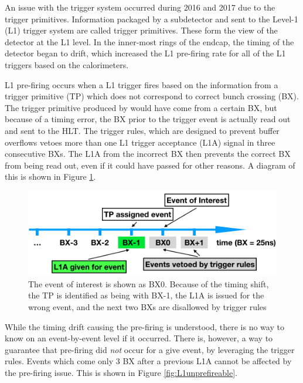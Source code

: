An issue with the \ECAL trigger system occurred during 2016 and 2017 due to the \ECAL trigger primitives. Information packaged by a subdetector and sent to the Level-1 (L1) trigger system are called trigger primitives.  These form the view of the \CMS detector at the L1 level.  In the inner-most rings of the \ECAL endcap, the timing of the detector began to drift, which increased the L1 pre-firing rate for all of the L1 triggers based on the calorimeters.

L1 pre-firing occurs when a L1 trigger fires based on the information from a trigger primitive (TP) which does not correspond to correct bunch crossing (BX).  The trigger primitive produced by \ECAL would have come from a certain BX, but because of a timing error, the BX prior to the trigger event is actually read out and sent to the HLT.  The \CMS trigger rules, which are designed to prevent buffer overflows vetoes more than one L1 trigger acceptance (L1A) signal in three consecutive BXs. The L1A from the incorrect BX then prevents the correct BX from being read out, even if it could have passed for other reasons.
A diagram of this is shown in Figure \ref{fig:L1prefire}.
\begin{figure}[!tp]
  \centering
  \includegraphics[width=\textwidth]{figures/prefire.png}
  \caption{The event of interest is shown as BX0.  Because of the timing shift, the TP is identified as being with BX-1, the L1A is issued for the wrong event, and the next two BXs are disallowed by trigger rules}
 
  \label{fig:L1prefire}
\end{figure}
While the timing drift causing the pre-firing is understood, there is no way to know on an event-by-event level if it occurred. There is, however, a way to guarantee that pre-firing did \emph{not} occur for a give event, by leveraging the trigger rules. Events which come only 3 BX after a previous L1A cannot be affected by the pre-firing issue. This is shown in Figure \ref{fig:L1unprefireable}.
